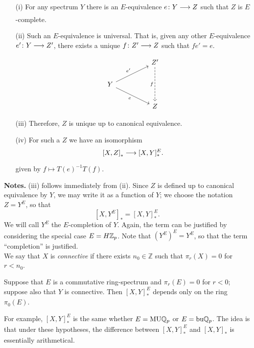 \documentclass[../main]{subfiles}
\begin{document}
   \begin{theorem} \label{thm:p3ch14.4}
     \begin{enumerate} 
       \item [(i)] For any spectrum $Y$ there is an $E$-equivalence  $e\colon Y \lar{} Z$ such that $Z$ is $E$-complete. 
       \item [(ii)] Such an $E$-equivalence is universal. That is, given any other $E$-equivalence $e'\colon Y \lar{} Z'$, there exists a unique $f\colon Z' \lar{} Z$ such that $fe'=e$.
\[\begin{tikzcd}
	&& {Z'} \\
	Y \\
	&& Z
	\arrow["{e'}", from=2-1, to=1-3]
	\arrow["e"', from=2-1, to=3-3]
	\arrow["f"', dashed, from=1-3, to=3-3]
\end{tikzcd}\]
\item [(iii)] Therefore, $Z$ is unique up to canonical equivalence.
\item [(iv)] For such a $Z$ we have an isomorphism
  \[
  \left[ X, Z  \right]_{\ast} \lar{} [X,Y]^E_{\ast}. 
  \] 
  given by $f \mapsto T (e)^{-1}T(f).$
     \end{enumerate}
     \textbf{Notes.} (iii) follows immediately from (ii). Since $Z$ is defined up to canonical equivalence by $Y$, we may write it as a function of $Y$; we choose the notation  $Z = Y^E$, so that
     \[
     \left[ X,Y^E\right]_{\ast} = \left[ X,Y \right] ^E_{\ast}.
     \] 
We will call $Y^E$ the $E$-completion of $Y$. Again, the term can be justified by considering the special case  $E=H\mathbb{Z}_{p}$. Note that $(Y^E)^E=Y^E$, so that the term ``completion'' is justified.\\
We say that $X$ is \textit{connective}  if there exists $n_{0} \in \mathbb{Z}$ such that $ \pi_{r}(X)=0$ for $r<n_{0}$. 
   \end{theorem}
   
   \begin{proposition} \label{prop:p3ch14.5}
     Suppose that $E$ is a commutative ring-spectrum and $ \pi_{r}(E)=0$ for $r<0$; suppose also that $Y$ is connective. Then  $\left[ X,Y \right] ^E_{\ast}$ depends only on the ring $ \pi_{0}(E)$.
     \end{proposition}
     
     For example,  $\left[ X,Y \right] ^E_{\ast}$ is the same whether $E=\mathrm{MU}\mathbb{Q}_{p}$ or $E=\mathrm{bu}\mathbb{Q}_{p}$. The idea is that under these hypotheses, the difference between $\left[ X,Y \right] ^E_{\ast}$ and $\left[ X,Y \right] _{\ast}$ is essentially arithmetical. 
     
\end{document}
